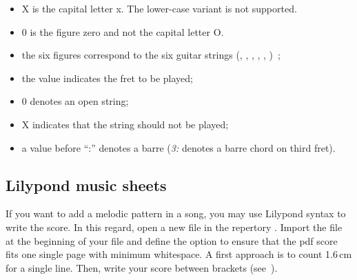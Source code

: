 \begin{songbook}
\end{songbook}

\begin{nota}
  \begin{itemize}
  \item X is the capital letter x. The lower-case variant is not supported.
  \item 0 is the figure zero and not the capital letter O.
  \end{itemize}
\end{nota}

\begin{itemize}
\item the six figures correspond to the six guitar strings
  (, , , ,
  , )~;
\item the value indicates the fret to be played;
\item 0 denotes an open string;
\item X indicates that the string should not be played;
\item a value before ``:'' denotes a barre (\emph{3:} denotes a barre chord on third fret).
\end{itemize}

\subsection{Lilypond music sheets}

If you want to add a melodic pattern in a song, you may use Lilypond
syntax to write the score. In this regard, open a new file
 in the repertory .
Import the file  at the beginning of your file and define
the option  to ensure that the pdf score fits
one single page with minimum whitespace. A first approach is to count
1.6\,cm for a single line. Then, write your score between brackets
(see~).

